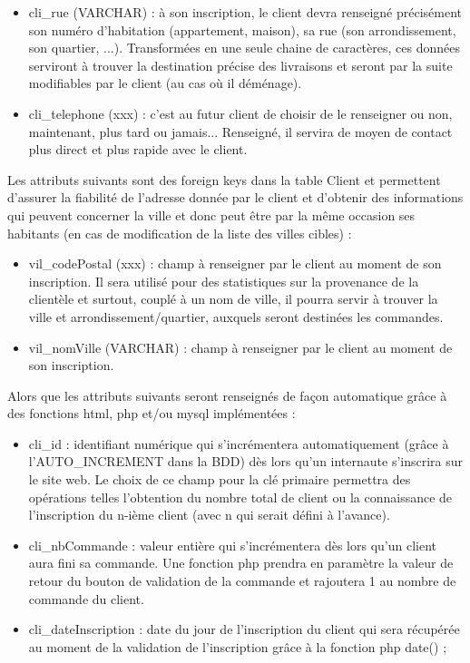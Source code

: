 \documentclass[a4paper, 12pt]{report}
\begin{document}
\begin{spacing}{1.2}
\begin{itemize}
	\item cli_rue (VARCHAR) : à son inscription, le client devra renseigné précisément son numéro d'habitation (appartement, maison), sa rue (son arrondissement, son quartier, ...). Transformées en une seule chaine de caractères, ces données serviront à trouver la destination précise des livraisons et seront par la suite modifiables par le client (au cas où il déménage).
	\item cli_telephone (xxx) : c'est au futur client de choisir de le renseigner ou non, maintenant, plus tard ou jamais... Renseigné, il servira de moyen de contact plus direct et plus rapide avec le client.
\end{itemize}
Les attributs suivants sont des foreign keys dans la table Client et permettent d'assurer la fiabilité de l'adresse donnée par le client et d'obtenir des informations qui peuvent concerner la ville et donc peut être par la même occasion ses habitants (en cas de modification de la liste des villes cibles) :
\begin{itemize}
	\item vil_codePostal (xxx) : champ à renseigner par le client au moment de son inscription. Il sera utilisé pour des statistiques sur la provenance de la clientèle et surtout, couplé à un nom de ville, il pourra servir à trouver la ville et arrondissement/quartier, auxquels seront destinées les commandes.
	\item vil_nomVille (VARCHAR) : champ à renseigner par le client au moment de son inscription.
\end{itemize}
Alors que les attributs suivants seront renseignés de façon automatique grâce à des fonctions html, php et/ou mysql implémentées :
\begin{itemize}
	\item cli_id : identifiant numérique qui s'incrémentera automatiquement (grâce à l'AUTO_INCREMENT dans la BDD) dès lors qu'un internaute s'inscrira sur le site web. Le choix de ce champ pour la clé primaire permettra des opérations telles l'obtention du nombre total de client ou la connaissance de l'inscription du n-ième client (avec n qui serait défini à l'avance).
	\item cli_nbCommande : valeur entière qui s'incrémentera dès lors qu'un client aura fini sa commande. Une fonction php prendra en paramètre la valeur de retour du bouton de validation de la commande et rajoutera 1 au nombre de commande du client.
	\item cli_dateInscription : date du jour de l'inscription du client qui sera récupérée au moment de la validation de l'inscription grâce à la fonction php date() ;
\end{itemize}


\end{spacing}
\end{document}
